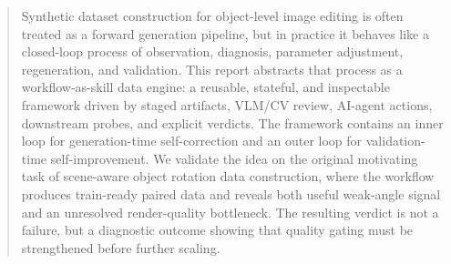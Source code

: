 \begin{abstract}
Synthetic dataset construction for object-level image editing is often treated as a forward generation pipeline, but in practice it behaves like a closed-loop process of observation, diagnosis, parameter adjustment, regeneration, and validation. This report abstracts that process as a workflow-as-skill data engine: a reusable, stateful, and inspectable framework driven by staged artifacts, VLM/CV review, AI-agent actions, downstream probes, and explicit verdicts. The framework contains an inner loop for generation-time self-correction and an outer loop for validation-time self-improvement. We validate the idea on the original motivating task of scene-aware object rotation data construction, where the workflow produces train-ready paired data and reveals both useful weak-angle signal and an unresolved render-quality bottleneck. The resulting \inspect{} verdict is not a failure, but a diagnostic outcome showing that quality gating must be strengthened before further scaling.
\end{abstract}
